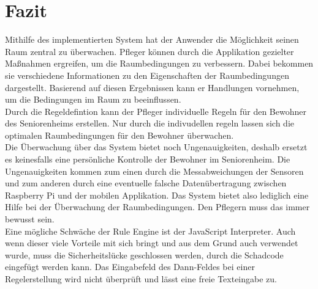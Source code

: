 \chapter{Fazit}
Mithilfe des implementierten System hat der Anwender die Möglichkeit seinen Raum zentral zu überwachen. Pfleger können durch die Applikation gezielter Maßnahmen ergreifen, um die Raumbedingungen zu verbessern. Dabei bekommen sie verschiedene Informationen zu den Eigenschaften der Raumbedingungen dargestellt. Basierend auf diesen Ergebnissen kann er Handlungen vornehmen, um die Bedingungen im Raum zu beeinflussen.\\
Durch die Regeldefintion kann der Pfleger individuelle Regeln für den Bewohner des Seniorenheims erstellen. Nur durch die indivudellen regeln lassen sich die optimalen Raumbedingungen für den Bewohner überwachen.\\
Die Überwachung über das System bietet noch Ungenauigkeiten, deshalb ersetzt es keinesfalls eine persönliche Kontrolle der Bewohner im Seniorenheim. Die Ungenauigkeiten kommen zum einen durch die Messabweichungen der Sensoren und zum anderen durch eine eventuelle falsche Datenübertragung zwischen Raspberry Pi und der mobilen Applikation. Das System bietet also lediglich eine Hilfe bei der Überwachung der Raumbedingungen. Den Pflegern muss das immer bewusst sein.\\
Eine mögliche Schwäche der Rule Engine ist der JavaScript Interpreter. Auch wenn dieser viele Vorteile mit sich bringt und aus dem Grund auch verwendet wurde, muss die Sicherheitslücke geschlossen werden, durch die Schadcode eingefügt werden kann. Das Eingabefeld des Dann-Feldes bei einer Regelerstellung wird nicht überprüft und lässt eine freie Texteingabe zu. 